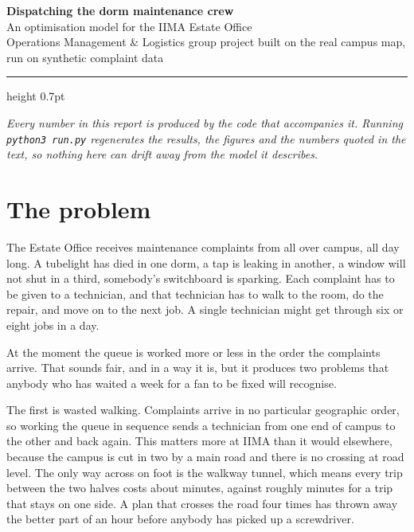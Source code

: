 \documentclass[11pt]{article}
\begin{document}
\begin{center}
{\sffamily\bfseries\LARGE\color{accent} Dispatching the dorm maintenance crew}\\[5pt]
{\sffamily\large An optimisation model for the IIMA Estate Office}\\[7pt]
{\small Operations Management \& Logistics \quad\textbar\quad group project \quad\textbar\quad
built on the real campus map, run on synthetic complaint data}
\end{center}
\vspace{2pt}
{\color{rulegrey}\hrule height 0.7pt}
\vspace{6pt}

{\small\itshape Every number in this report is produced by the code that
accompanies it. Running \texttt{python3 run.py} regenerates the results, the
figures and the numbers quoted in the text, so nothing here can drift away
from the model it describes.}

\section{The problem}

The Estate Office receives maintenance complaints from all over campus, all
day long. A tubelight has died in one dorm, a tap is leaking in another, a
window will not shut in a third, somebody's switchboard is sparking. Each
complaint has to be given to a technician, and that technician has to walk to
the room, do the repair, and move on to the next job. A single technician
might get through six or eight jobs in a day.

At the moment the queue is worked more or less in the order the complaints
arrive. That sounds fair, and in a way it is, but it produces two problems
that anybody who has waited a week for a fan to be fixed will recognise.

The first is wasted walking. Complaints arrive in no particular geographic
order, so working the queue in sequence sends a technician from one end of
campus to the other and back again. This matters more at IIMA than it would
elsewhere, because the campus is cut in two by a main road and there is no
crossing at road level. The only way across on foot is the walkway tunnel,
which means every trip between the two halves costs about
\NMeanCrossCampus{} minutes, against roughly \NMeanSameCampus{} minutes for
a trip that stays on one side. A plan that crosses the road four times has
thrown away the better part of an hour before anybody has picked up a
screwdriver.
\end{document}
